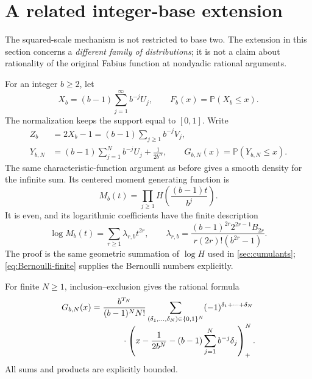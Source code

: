 \documentclass[11pt,a4paper]{article}
\numberwithin{equation}{section}
\theoremstyle{definition}
\theoremstyle{remark}
\newcommand{\Pp}{\mathbb P}
\newcommand{\pos}[1]{\left(#1\right)_+}
\begin{document}
\section{A related integer-base extension}
\label{sec:base-extension}

The squared-scale mechanism is not restricted to base two. The extension in this section concerns a \emph{different family of distributions}; it is not a claim about rationality of the original Fabius function at nondyadic rational arguments.

For an integer $b\ge2$, let
\begin{equation}
 X_b=(b-1)\sum_{j=1}^{\infty}b^{-j}U_j,
 \qquad F_b(x)=\Pp(X_b\le x).
 \label{eq:base-X}
\end{equation}
The normalization keeps the support equal to $[0,1]$. Write
\begin{equation}
 \begin{split}
 Z_b&=2X_b-1=(b-1)\sum_{j\ge1}b^{-j}V_j,\\
 Y_{b,N}&=(b-1)\sum_{j=1}^{N}b^{-j}U_j+\frac1{2b^N},
 \qquad G_{b,N}(x)=\Pp(Y_{b,N}\le x).
 \end{split}
 \label{eq:base-prefix}
\end{equation}
The same characteristic-function argument as before gives a smooth density for the infinite sum. Its centered moment generating function is
\[
 M_b(t)=\prod_{j\ge1}H\!\left(\frac{(b-1)t}{b^j}\right).
\]
It is even, and its logarithmic coefficients have the finite description
\begin{equation}
 \log M_b(t)=\sum_{r\ge1}\lambda_{r,b}t^{2r},\qquad
 \lambda_{r,b}=
 \frac{(b-1)^{2r}2^{2r-1}B_{2r}}
 {r(2r)!(b^{2r}-1)}.
 \label{eq:base-lambda}
\end{equation}
The proof is the same geometric summation of $\log H$ used in \cref{sec:cumulants}; \cref{eq:Bernoulli-finite} supplies the Bernoulli numbers explicitly.

For finite $N\ge1$, inclusion--exclusion gives the rational formula
\begin{equation}
\begin{split}
 G_{b,N}(x)={}&\frac{b^{T_N}}{(b-1)^NN!}
  \sum_{(\delta_1,\ldots,\delta_N)\in\{0,1\}^N}
  (-1)^{\delta_1+\cdots+\delta_N}\\[-1mm]
 &\hspace{8mm}\cdot
 \pos{x-\frac1{2b^N}-(b-1)\sum_{j=1}^{N}b^{-j}\delta_j}^{N}.
\end{split}
\label{eq:base-spline}
\end{equation}
All sums and products are explicitly bounded.
\end{document}
